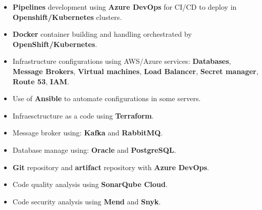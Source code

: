 \documentclass[letterpaper]{style} %
\begin{document}


\begin{itemize}
	\item \textbf{Pipelines} development using \textbf{Azure DevOps} for CI/CD to deploy in \textbf{Openshift/Kubernetes} clusters.
	\item \textbf{Docker} container building and handling orchestrated by \textbf{OpenShift/Kubernetes}.
	\item Infrastructure configurations using AWS/Azure services: \textbf{Databases}, \textbf{Message Brokers}, \textbf{Virtual machines}, \textbf{Load Balancer}, \textbf{Secret manager}, \textbf{Route 53}, \textbf{IAM}.
	\item Use of \textbf{Ansible} to automate configurations in some servers.
	\item Infraesctructure as a code using \textbf{Terraform}.
	\item Message broker using: \textbf{Kafka} and \textbf{RabbitMQ}.
	\item Database manage using: \textbf{Oracle} and \textbf{PostgreSQL}.
	\item \textbf{Git} repository and \textbf{artifact} repository with \textbf{Azure DevOps}.
	\item Code quality analysis using \textbf{SonarQube Cloud}.
	\item Code security analysis using \textbf{Mend} and \textbf{Snyk}.
\end{itemize}




\newpage %

\makeprofileSecond %
\end{document}
